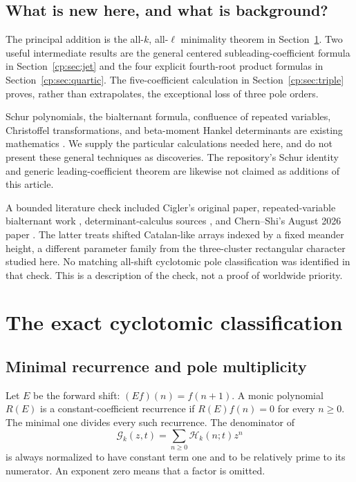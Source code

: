 \documentclass[11pt]{article}
\theoremstyle{definition}
\theoremstyle{remark}
\newcommand{\Ht}{\mathcal H}
\newcommand{\GG}{\mathscr G}
\theoremstyle{definition}
\theoremstyle{plain}
\numberwithin{equation}{section}
\begin{document}
\subsection{What is new here, and what is background?}
The principal addition is the all-$k$, all-$\ell$ minimality theorem in
Section~\ref{cp:sec:main}. Two useful intermediate results are the general
centered subleading-coefficient formula in Section~\ref{cp:sec:jet} and the
four explicit fourth-root product formulas in Section~\ref{cp:sec:quartic}.
The five-coefficient calculation in Section~\ref{cp:sec:triple} proves, rather
than extrapolates, the exceptional loss of three pole orders.

Schur polynomials, the bialternant formula, confluence of repeated variables,
Christoffel transformations, and beta-moment Hankel determinants are existing
mathematics \cite{GSM,Kratt}. We supply the particular calculations needed
here, and do not present these general techniques as discoveries. The
repository's Schur identity and generic leading-coefficient theorem are
likewise not claimed as additions of this article.

A bounded literature check included Cigler's original paper, repeated-variable
bialternant work \cite{GSM}, determinant-calculus sources \cite{Kratt}, and
Chern--Shi's August 2026 paper \cite{ChernShi}. The latter treats shifted
Catalan-like arrays indexed by a fixed meander height, a different parameter
family from the three-cluster rectangular character studied here. No matching
all-shift cyclotomic pole classification was identified in that check. This is
a description of the check, not a proof of worldwide priority.

\section{The exact cyclotomic classification}
\label{cp:sec:main}

\subsection{Minimal recurrence and pole multiplicity}
Let $E$ be the forward shift: $(Ef)(n)=f(n+1)$. A monic polynomial $R(E)$
is a constant-coefficient recurrence if $R(E)f(n)=0$ for every $n\ge0$.
The minimal one divides every such recurrence. The denominator of
\begin{equation}
 \GG_k(z,t)=\sum_{n\ge0}\Ht_k(n;t)z^n
 \label{cp:eq:gf}
\end{equation}
is always normalized to have constant term one and to be relatively prime
to its numerator. An exponent zero means that a factor is omitted.
\end{document}

